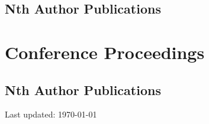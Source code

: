 \documentclass[10pt,letterpaper]{article}
\begin{document}
\subsection*{Nth Author Publications}
\begin{bibunit}[bibstyle]
\nocite{2018arXiv180400659E}  %
\nocite{2018arXiv180305424B}  %
\nocite{2018arXiv180103099L}  %
\nocite{2017arXiv171205808S}  %
\nocite{2017arXiv171204467N}  %
\nocite{2017arXiv170206148H}  %
\vspace{-3em}
\putbib[mypubs]
\end{bibunit}


\section*{Conference Proceedings}
\subsection*{Nth Author Publications}
\begin{bibunit}[bibstyle]
\nocite{2017AAS...22941806B}  %
\nocite{2013pdmg.conf30203R}  %
\nocite{2009APS..MAR.K1007P}  %
\vspace{-3em}
\putbib[mypubs]
\end{bibunit}


\medskip
\begin{center}
  \begin{small}
    Last updated: \today
  \end{small}
\end{center}
\end{document}
